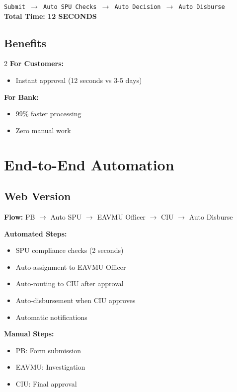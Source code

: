 \documentclass[11pt,a4paper]{article}
\begin{document}
\begin{tcolorbox}[colback=codecolor,colframe=tealcolor,title=\textbf{12-Second Process}]
\texttt{Submit $\rightarrow$ Auto SPU Checks $\rightarrow$ Auto Decision $\rightarrow$ Auto Disburse}\\[0.3cm]
\textbf{Total Time: 12 SECONDS}
\end{tcolorbox}

\subsection{Benefits}
\begin{multicols}{2}
\textbf{For Customers:}
\begin{itemize}[leftmargin=*,noitemsep]
    \item Instant approval (12 seconds vs 3-5 days)
\end{itemize}

\textbf{For Bank:}
\begin{itemize}[leftmargin=*,noitemsep]
    \item 99\% faster processing
    \item Zero manual work
\end{itemize}
\end{multicols}

\section{End-to-End Automation}

\subsection{Web Version}
\textbf{Flow:} PB $\rightarrow$ Auto SPU $\rightarrow$ EAVMU Officer $\rightarrow$ CIU $\rightarrow$ Auto Disburse

\textbf{Automated Steps:}
\begin{itemize}[leftmargin=*,noitemsep]
    \item SPU compliance checks (2 seconds)
    \item Auto-assignment to EAVMU Officer
    \item Auto-routing to CIU after approval
    \item Auto-disbursement when CIU approves
    \item Automatic notifications
\end{itemize}

\textbf{Manual Steps:}
\begin{itemize}[leftmargin=*,noitemsep]
    \item PB: Form submission
    \item EAVMU: Investigation
    \item CIU: Final approval
\end{itemize}
\end{document}
